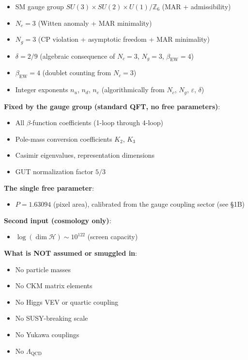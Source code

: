 \begin{itemize}
\tightlist
\item
  SM gauge group \(SU(3) \times SU(2) \times U(1)/\mathbb{Z}_6\) (MAR + admissibility)
\item
  \(N_c = 3\) (Witten anomaly + MAR minimality)
\item
  \(N_g = 3\) (CP violation + asymptotic freedom + MAR minimality)
\item
  \(\delta = 2/9\) (algebraic consequence of \(N_c = 3\), \(N_g = 3\), \(\beta_{\text{EW}} = 4\))
\item
  \(\beta_{\text{EW}} = 4\) (doublet counting from \(N_c = 3\))
\item
  Integer exponents \(n_u\), \(n_d\), \(n_e\) (algorithmically from \(N_c\), \(N_g\), \(\varepsilon\), \(\delta\))
\end{itemize}

\textbf{Fixed by the gauge group (standard QFT, no free parameters)}:

\begin{itemize}
\tightlist
\item
  All \(\beta\)-function coefficients (1-loop through 4-loop)
\item
  Pole-mass conversion coefficients \(K_2\), \(K_3\)
\item
  Casimir eigenvalues, representation dimensions
\item
  GUT normalization factor \(5/3\)
\end{itemize}

\textbf{The single free parameter}:

\begin{itemize}
\tightlist
\item
  \(P = 1.63094\) (pixel area), calibrated from the gauge coupling sector (see §1B)
\end{itemize}

\textbf{Second input (cosmology only)}:

\begin{itemize}
\tightlist
\item
  \(\log(\dim\mathcal{H}) \sim 10^{122}\) (screen capacity)
\end{itemize}

\textbf{What is NOT assumed or smuggled in}:

\begin{itemize}
\tightlist
\item
  No particle masses
\item
  No CKM matrix elements
\item
  No Higgs VEV or quartic coupling
\item
  No SUSY-breaking scale
\item
  No Yukawa couplings
\item
  No \(\Lambda_{\text{QCD}}\)
\end{itemize}

